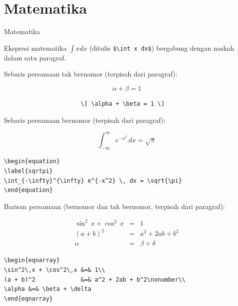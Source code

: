 \documentclass[11pt,            %
               aspectratio=169, %
               xcolor=svgnames,
               t                %
               ]{beamer}
\begin{document}
\section{Matematika}
\begin{frame}{Matematika}
\label{math}

Ekspresi matematika $\int x dx$  (ditulis \verb|$\int x dx$|) bergabung dengan naskah dalam satu paragraf.

\bigskip

Sebaris persamaan tak bernomor (terpisah dari paragraf):

\[ \alpha + \beta = 1 \]

\begin{block}{}
\begin{verbatim}
                      \[ \alpha + \beta = 1 \]
\end{verbatim}
\end{block}
\newpage
Sebaris persamaan bernomor (terpisah dari paragraf):

\begin{equation}
\label{sqrtpi}
\int_{-\infty}^{\infty} e^{-x^2} \, dx = \sqrt{\pi}
\end{equation}

\begin{block}{}
\begin{verbatim}
\begin{equation}
\label{sqrtpi}
\int_{-\infty}^{\infty} e^{-x^2} \, dx = \sqrt{\pi}
\end{equation}
\end{verbatim}
\end{block}
\newpage
Barisan persamaan (bernomor dan tak bernomor, terpisah dari paragraf):

\begin{eqnarray}
\sin^2\,x + \cos^2\,x &=& 1\\
(a + b)^2             &=& a^2 + 2ab + b^2\nonumber\\
\alpha &=& \beta + \delta
\end{eqnarray}

\begin{block}{}
\begin{verbatim}
\begin{eqnarray}
\sin^2\,x + \cos^2\,x &=& 1\\
(a + b)^2             &=& a^2 + 2ab + b^2\nonumber\\
\alpha &=& \beta + \delta
\end{eqnarray}
\end{verbatim}
\end{block}


\end{frame}
\end{document}
